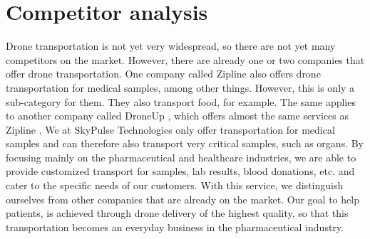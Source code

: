 \chapter{Competitor analysis}
Drone transportation is not yet very widespread, so there are not yet many competitors on the market. However, there are already one or two companies that offer drone transportation. One company called Zipline \cite{zipline_24} also offers drone transportation for medical samples, among other things. However, this is only a sub-category for them. They also transport food, for example. The same applies to another company called DroneUp \cite{droneup}, which offers almost the same services as Zipline \cite{zipline_24}. We at SkyPulse Technologies only offer transportation for medical samples and can therefore also transport very critical samples, such as organs. By focusing mainly on the pharmaceutical and healthcare industries, we are able to provide customized transport for samples, lab results, blood donations, etc. and cater to the specific needs of our customers. With this service, we distinguish ourselves from other companies that are already on the market. Our goal to help patients, is achieved through drone delivery of the highest quality, so that this transportation becomes an everyday business in the pharmaceutical industry.
